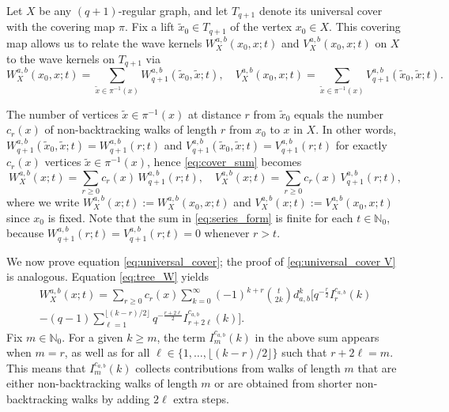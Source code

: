 \documentclass[reqno,10pt]{amsart}
\theoremstyle{definition}
\numberwithin{equation}{section}
\begin{document}
Let $X$ be any $(q+1)$-regular graph, and let $T_{q+1}$ denote its universal cover with the covering map $\pi$. Fix a lift $\tilde{x}_0\in T_{q+1}$ of the vertex $x_0\in X$. This covering map allows us to relate the wave kernels $W_X^{a,b}(x_0, x; t)$ and $V_X^{a,b}(x_0, x; t)$ on $X$ to the wave kernels on $T_{q+1}$ via
\begin{equation} \label{eq:cover_sum}
    W_X^{a,b}(x_0, x; t) = \sum_{\tilde{x} \in \pi^{-1}(x)} W^{a,b}_{q+1}(\tilde{x}_0, \tilde{x}; t), \quad  V_X^{a,b}(x_0, x; t) = \sum_{\tilde{x} \in \pi^{-1}(x)} V^{a,b}_{q+1}(\tilde{x}_0, \tilde{x}; t).
\end{equation}

The number of vertices $\tilde{x}\in\pi^{-1}(x)$ at distance $r$ from $\tilde{x}_0$ equals the number $c_r(x)$ of non-backtracking walks of length $r$ from $x_0$ to $x$ in $X$. In other words,   $W^{a,b}_{q+1}(\tilde{x}_0, \tilde{x}; t) = W^{a,b}_{q+1}(r; t)$  and $V^{a,b}_{q+1}(\tilde{x}_0, \tilde{x}; t) = V^{a,b}_{q+1}(r; t)$ for exactly $c_r(x)$ vertices $\tilde{x} \in \pi^{-1}(x)$, hence \eqref{eq:cover_sum} becomes
\begin{equation} \label{eq:series_form}
    W_X^{a,b}(x; t) = \sum_{r \geq 0} c_r(x) \, W^{a,b}_{q+1}(r; t), \quad  V_X^{a,b}(x; t) = \sum_{r \geq 0} c_r(x) \, V^{a,b}_{q+1}(r; t),
\end{equation}
where we write $W_X^{a,b}(x; t) := W_X^{a,b}(x_0, x; t)$ and $V_X^{a,b}(x; t) := V_X^{a,b}(x_0, x; t)$ since $x_0$ is fixed.
Note that the sum in \eqref{eq:series_form} is finite for each $t \in \mathbb{N}_0$, because $W^{a,b}_{q+1}(r; t)=V^{a,b}_{q+1}(r; t) = 0$ whenever $r > t$.

We now prove equation \eqref{eq:universal_cover}; the proof of \eqref{eq:universal_cover V} is analogous.
Equation \eqref{eq:tree_W} yields
\begin{multline*}
    W_X^{a,b}(x; t) = \sum_{r \geq 0} c_r(x) \sum_{k=0}^{\infty} (-1)^{k+r} \binom{t}{2k}d_{a,b}^k
    \bigg[ q^{-\tfrac{r}{2}} I_r^{c_{a,b}}(k) \\
    - (q-1) \sum_{\ell=1}^{\lfloor (k-r)/2 \rfloor} q^{-\tfrac{r+2\ell}{2}} I_{r+2\ell}^{c_{a,b}}(k) \bigg].
\end{multline*}
Fix $m \in \mathbb{N}_0$. For a given $k \ge m$, the term $I_m^{c_{a,b}}(k)$ in the above sum appears when $m = r$, as well as for all $\ell \in \{1, \dots, \lfloor (k-r)/2 \rfloor\}$ such that $r + 2\ell = m$.
This means that $I_m^{c_{a,b}}(k)$ collects contributions from walks of length $m$ that are either non-backtracking walks of length $m$ or are obtained from shorter non-backtracking walks by adding $2\ell$ extra steps.
\end{document}
